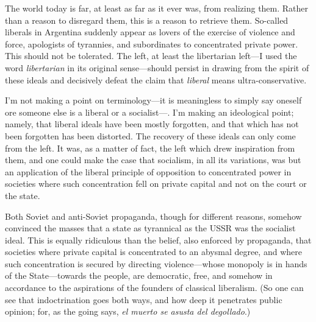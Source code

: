 \documentclass[a4paper]{article}
\begin{document}
The world today is far, at least as far as it ever was, from realizing them.
Rather than a reason to disregard them, this is a reason to retrieve them.
So-called liberals in Argentina suddenly appear as lovers of the exercise of
violence and force, apologists of tyrannies, and subordinates to concentrated
private power. This should not be tolerated. The left, at least the libertarian
left---I used the word \textit{libertarian} in its original sense---should
persist in drawing from the spirit of these ideals and decisively defeat the
claim that \textit{liberal} means ultra-conservative. 

I'm not making a point on terminology---it is meaningless to simply say oneself
ore someone else is a liberal or a socialist---. I'm making an ideological
point; namely, that liberal ideals have been mostly forgotten, and that which
has not been forgotten has been distorted. The recovery of these ideals can
only come from the left. It was, as a matter of fact, the left which drew
inspiration from them, and one could make the case that socialism, in all its
variations, was but an application of the liberal principle of opposition to
concentrated power in societies where such concentration fell on private
capital and not on the court or the state. 

Both Soviet and anti-Soviet propaganda, though for different reasons, somehow
convinced the masses that a state as tyrannical as the USSR was the socialist
ideal. This is equally ridiculous than the belief, also enforced by propaganda,
that societies where private capital is concentrated to an abysmal degree, and
where such concentration is secured by directing violence---whose monopoly is
in hands of the State---towards the people, are democratic, free, and somehow
in accordance to the aspirations of the founders of classical liberalism. (So
one can see that indoctrination goes both ways, and how deep it penetrates
public opinion; for, as the going says, \textit{el muerto se asusta del
degollado}.) 
\end{document}
